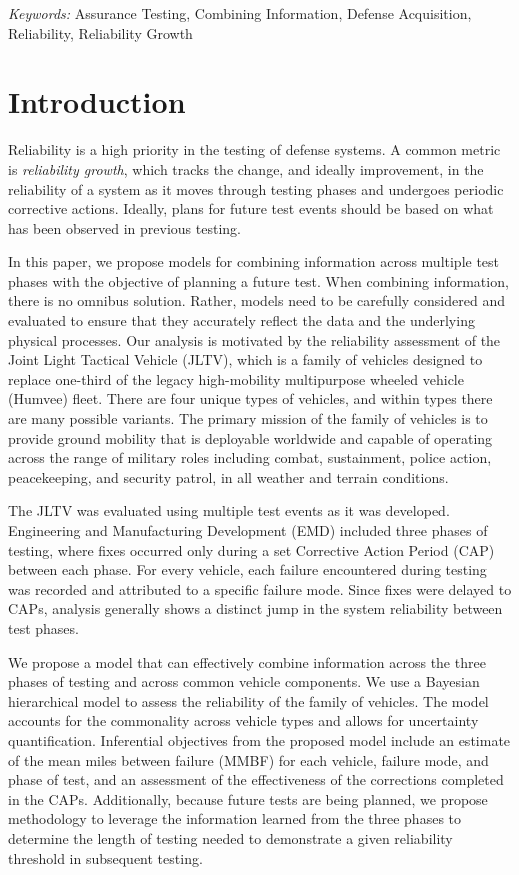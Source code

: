 \documentclass[12pt]{article}
\begin{document}
\noindent%
{\it Keywords:}  Assurance Testing, Combining Information, Defense Acquisition, Reliability, Reliability Growth
\vfill

\newpage
\doublespacing
\section{Introduction}
Reliability is a high priority in the testing of defense systems. A common
metric is {\em reliability growth}, which tracks the change, and ideally
improvement, in the reliability of a system as it moves through testing phases
and undergoes periodic corrective actions. Ideally, plans for future test events
should be based on what has been observed in previous testing.

In this paper, we propose models for combining information across multiple test phases with
the objective of planning a future test. When combining information, there is no
omnibus solution. Rather, models need to be carefully considered and evaluated
to ensure that they accurately reflect the data and the underlying physical
processes. Our analysis is motivated by the reliability assessment of the Joint Light
Tactical Vehicle (JLTV), which is a family of vehicles designed to replace
one-third of the legacy high-mobility multipurpose wheeled vehicle (Humvee)
fleet. There are four unique types of vehicles, and within types there are many
possible variants. The primary mission of the family of vehicles is to provide
ground mobility that is deployable worldwide and capable of operating across the
range of military roles including combat, sustainment, police action,
peacekeeping, and security patrol, in all weather and terrain conditions.

The JLTV was evaluated using multiple test events as it was developed.
Engineering and Manufacturing Development (EMD) included three phases of
testing, where fixes occurred only during a set Corrective Action Period (CAP)
between each phase. For every vehicle, each failure encountered during testing
was recorded and attributed to a specific failure mode.  Since fixes were
delayed to CAPs, analysis generally shows a distinct jump in the system
reliability between test phases.

We propose a model that can effectively combine information across the three
phases of testing and across common vehicle components. We use a Bayesian
hierarchical model to assess the reliability of the family of vehicles. The
model accounts for the commonality across vehicle types and allows for
uncertainty quantification. Inferential objectives from the proposed model
include an estimate of the mean miles between failure (MMBF) for each vehicle,
failure mode, and phase of test, and an assessment of the effectiveness of the
corrections completed in the CAPs. Additionally, because future tests are being
planned, we propose methodology to leverage the information learned from the
three phases to determine the length of testing needed to demonstrate a given
reliability threshold in subsequent testing.
\end{document}
